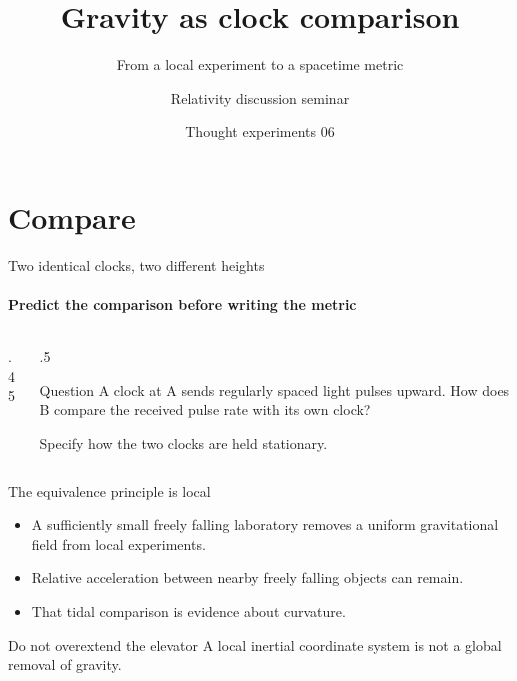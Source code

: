 \documentclass[11pt,aspectratio=169]{beamer}
\title{Gravity as clock comparison}
\subtitle{From a local experiment to a spacetime metric}
\author{Relativity discussion seminar}
\date{Thought experiments 06}
\begin{document}
\maketitle
\section{Compare}
\begin{frame}{Two identical clocks, two different heights}
\framesubtitle{Predict the comparison before writing the metric}
\begin{columns}[c]
\begin{column}{.45\textwidth}
\end{column}
\begin{column}{.5\textwidth}
\begin{block}{Question}
A clock at A sends regularly spaced light pulses upward. How does B compare the received pulse rate with its own clock?
\end{block}
Specify how the two clocks are held stationary.
\end{column}
\end{columns}
\end{frame}
\begin{frame}{The equivalence principle is local}
\begin{itemize}[<+->]
\item A sufficiently small freely falling laboratory removes a uniform gravitational field from local experiments.
\item Relative acceleration between nearby freely falling objects can remain.
\item That tidal comparison is evidence about curvature.
\end{itemize}
\begin{alertblock}{Do not overextend the elevator}
A local inertial coordinate system is not a global removal of gravity.
\end{alertblock}
\end{frame}
\end{document}
